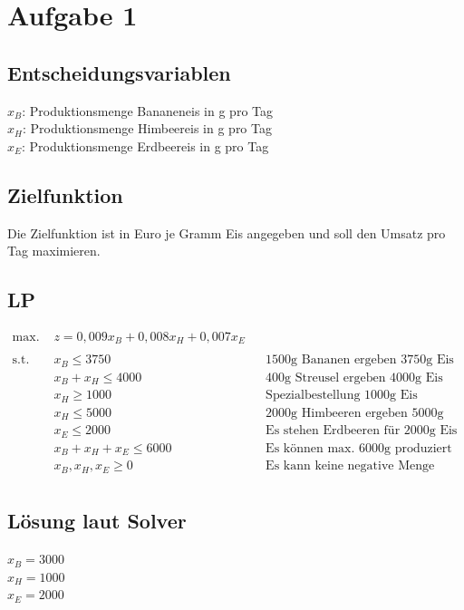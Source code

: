 \documentclass[a4paper,11pt]{article}
\begin{document}
\section*{Aufgabe 1}

\subsection*{Entscheidungsvariablen}
\begin{flushleft}
$x_{B}$: Produktionsmenge Bananeneis in g pro Tag \\
$x_{H}$: Produktionsmenge Himbeereis in g pro Tag \\
$x_{E}$: Produktionsmenge Erdbeereis in g pro Tag \\
\end{flushleft}

\subsection*{Zielfunktion}
Die Zielfunktion ist in Euro je Gramm Eis angegeben und soll den Umsatz pro Tag maximieren.

\subsection*{LP}
\begin{align*}
    \text{max. } & z = 0,009x_{B} + 0,008x_{H} + 0,007x_{E} \\
    \\
    \text{s.t. } & x_{B} \le 3750 && \text{1500g Bananen ergeben 3750g Eis} \\
    & x_{B} + x_{H} \le 4000 && \text{400g Streusel ergeben 4000g Eis} \\
    & x_{H} \ge 1000 && \text{Spezialbestellung 1000g Eis} \\
    & x_{H} \le 5000 && \text{2000g Himbeeren ergeben 5000g Eis} \\
    & x_{E} \le 2000 && \text{Es stehen Erdbeeren für 2000g Eis zur verfügung} \\
    & x_{B} + x_{H} + x_{E} \le 6000 && \text{Es können max. 6000g produziert werden} \\
    & x_{B}, x_{H}, x_{E} \ge 0 && \text{Es kann keine negative Menge produziert werden} \\
\end{align*}

\subsection*{Lösung laut Solver}
\begin{flushleft}
$x_{B} = 3000$\\
$x_{H} = 1000$\\
$x_{E} = 2000$\\
\end{flushleft}
\end{document}
